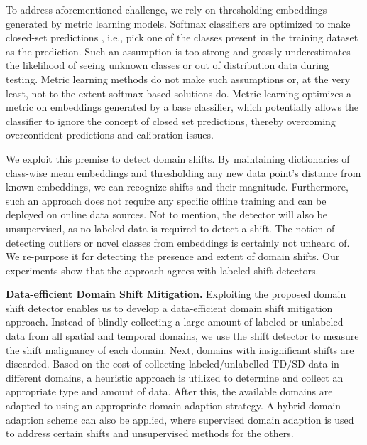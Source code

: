 \documentclass{article}
\begin{document}
To address aforementioned challenge, we rely on thresholding embeddings generated by metric learning models. Softmax classifiers are optimized to make closed-set predictions \cite{geng2020recent}, i.e., pick one of the classes present in the training dataset as the prediction. Such an assumption is too strong and grossly underestimates the likelihood of seeing unknown classes or out of distribution data during testing. Metric learning methods do not make such assumptions or, at the very least, not to the extent softmax based solutions do. Metric learning optimizes a metric on embeddings generated by a base classifier, which potentially allows the classifier to ignore the concept of closed set predictions, thereby overcoming overconfident predictions and calibration issues.

We exploit this premise to detect domain shifts. By maintaining dictionaries of class-wise mean embeddings and thresholding any new data point's distance from known embeddings, we can recognize shifts and their magnitude. Furthermore, such an approach does not require any specific offline training and can be deployed on online data sources. Not to mention, the detector will also be unsupervised, as no labeled data is required to detect a shift. The notion of detecting outliers or novel classes from embeddings is certainly not unheard of. We re-purpose it for detecting the presence and extent of domain shifts. Our experiments show that the approach agrees with labeled shift detectors. 

\textbf{Data-efficient Domain Shift Mitigation.} Exploiting the proposed domain shift detector enables us to develop a data-efficient domain shift mitigation approach. Instead of blindly collecting a large amount of labeled or unlabeled data from all spatial and temporal domains, we use the shift detector to measure the shift malignancy of each domain. Next, domains with insignificant shifts are discarded. Based on the cost of collecting labeled/unlabelled TD/SD data in different domains, a heuristic approach is utilized to determine and collect an appropriate type and amount of data. After this, the available domains are adapted to using an appropriate domain adaption strategy. A hybrid domain adaption scheme can also be applied, where supervised domain adaption is used to address certain shifts and unsupervised methods for the others.
\end{document}

